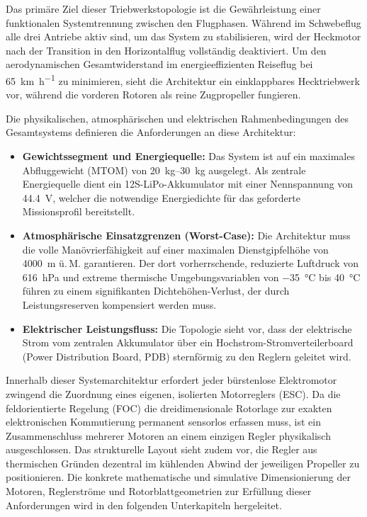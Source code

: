\noindent
Das primäre Ziel dieser Triebwerkstopologie ist die Gewährleistung einer funktionalen Systemtrennung zwischen den Flugphasen. Während im Schwebeflug alle drei Antriebe aktiv sind, um das System zu stabilisieren, wird der Heckmotor nach der Transition in den Horizontalflug vollständig deaktiviert. Um den aerodynamischen Gesamtwiderstand im energieeffizienten Reiseflug bei \SI{65}{\kilo\meter\per\hour} zu minimieren, sieht die Architektur ein einklappbares Hecktriebwerk vor, während die vorderen Rotoren als reine Zugpropeller fungieren.

\noindent
Die physikalischen, atmosphärischen und elektrischen Rahmenbedingungen des Gesamtsystems definieren die Anforderungen an diese Architektur:

\begin{itemize}
    \item \textbf{Gewichtssegment und Energiequelle:} Das System ist auf ein maximales Abfluggewicht (MTOM) von \SIrange{20}{30}{\kilo\gram} ausgelegt. Als zentrale Energiequelle dient ein 12S-LiPo-Akkumulator mit einer Nennspannung von \SI{44.4}{\volt}, welcher die notwendige Energiedichte für das geforderte Missionsprofil bereitstellt.
    \item \textbf{Atmosphärische Einsatzgrenzen (Worst-Case):} Die Architektur muss die volle Manövrierfähigkeit auf einer maximalen Dienstgipfelhöhe von \SI{4000}{\meter} ü.\,M. garantieren. Der dort vorherrschende, reduzierte Luftdruck von \SI{616}{\hecto\pascal} und extreme thermische Umgebungsvariablen von \SI{-35}{\celsius} bis \SI{40}{\celsius} führen zu einem signifikanten Dichtehöhen-Verlust, der durch Leistungsreserven kompensiert werden muss.
    \item \textbf{Elektrischer Leistungsfluss:} Die Topologie sieht vor, dass der elektrische Strom vom zentralen Akkumulator über ein Hochstrom-Stromverteilerboard (Power Distribution Board, PDB) sternförmig zu den Reglern geleitet wird.
\end{itemize}

\noindent
Innerhalb dieser Systemarchitektur erfordert jeder bürstenlose Elektromotor zwingend die Zuordnung eines eigenen, isolierten Motorreglers (ESC). Da die feldorientierte Regelung (FOC) die dreidimensionale Rotorlage zur exakten elektronischen Kommutierung permanent sensorlos erfassen muss, ist ein Zusammenschluss mehrerer Motoren an einem einzigen Regler physikalisch ausgeschlossen. Das strukturelle Layout sieht zudem vor, die Regler aus thermischen Gründen dezentral im kühlenden Abwind der jeweiligen Propeller zu positionieren. Die konkrete mathematische und simulative Dimensionierung der Motoren, Reglerströme und Rotorblattgeometrien zur Erfüllung dieser Anforderungen wird in den folgenden Unterkapiteln hergeleitet.

